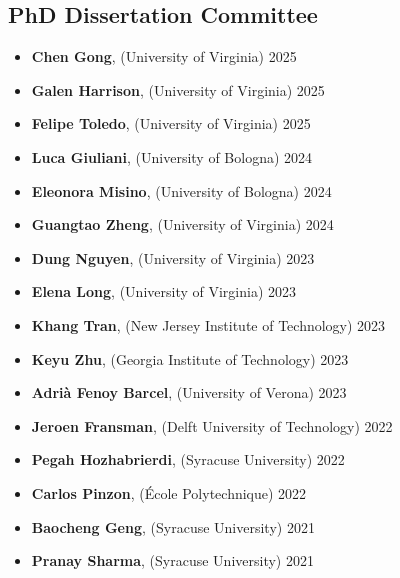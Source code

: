 \subsection*{PhD Dissertation Committee}
\begin{itemize}
  \item \textbf{Chen Gong},  ({\sc University of Virginia}) \hfill 2025
  \item \textbf{Galen Harrison}, ({\sc University of Virginia}) \hfill 2025
  \item \textbf{Felipe Toledo}, ({\sc University of Virginia}) \hfill 2025
  \item \textbf{Luca Giuliani}, ({\sc University of Bologna}) \hfill 2024
  \item \textbf{Eleonora Misino}, ({\sc University of Bologna}) \hfill 2024
  \item \textbf{Guangtao Zheng}, ({\sc University of Virginia}) \hfill 2024
  \item \textbf{Dung Nguyen}, ({\sc University of Virginia}) \hfill 2023
  \item \textbf{Elena Long}, ({\sc University of Virginia}) \hfill 2023
  \item \textbf{Khang Tran}, ({\sc New Jersey Institute of Technology}) \hfill 2023
  \item \textbf{Keyu Zhu}, ({\sc Georgia Institute of Technology}) \hfill 2023
  \item \textbf{Adrià Fenoy Barcel}, ({\sc University of Verona}) \hfill 2023
  \item \textbf{Jeroen Fransman}, ({\sc Delft University of Technology}) \hfill 2022
  \item \textbf{Pegah Hozhabrierdi}, ({\sc Syracuse University}) \hfill 2022
  \item \textbf{Carlos Pinzon}, ({\sc École Polytechnique}) \hfill 2022
  \item \textbf{Baocheng Geng}, ({\sc Syracuse University}) \hfill 2021
  \item \textbf{Pranay Sharma}, ({\sc Syracuse University}) \hfill 2021
\end{itemize}
\medskip